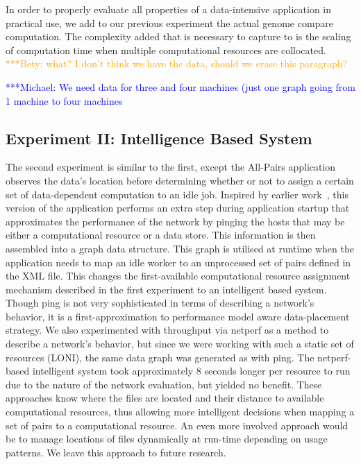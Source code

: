 \documentclass{rspublic}
\newcommand{\micnote}[1]{ {\textcolor{blue} { ***Michael: #1 }}}
\newcommand{\betynote}[1]{ {\textcolor{orange} { ***Bety: #1 }}}
\newcommand{\jhanote}[1]{} \newcommand{\micnote}[1]{}\newcommand{\betynote}[1]{} \newcommand{\fixme}[1]{}
\begin{document}

In order to properly evaluate all properties of a data-intensive
application in practical use, we add to our previous experiment the actual genome
compare computation. The complexity added that is necessary to capture to is
the scaling of computation time when multiple computational resources are
collocated. \betynote{what? I don't think we have the data, should we erase this paragraph?}

\jhanote{We need data for compute (comparison) and I/O (only) for
different data-set sizes} \micnote{We need data for three and four
machines (just one graph going from 1 machine to four machines}

\subsection{Experiment II: Intelligence Based System}
The second experiment is similar to the first, except the All-Pairs
application observes the data's location before determining whether or
not to assign a certain set of data-dependent computation to an idle
job. Inspired by earlier work~\citep{netperf}, this version of the
application performs an extra step during application startup that
approximates the performance of the network by pinging the hosts that
may be either a computational resource or a data store. This
information is then assembled into a graph data structure. This graph
is utilised at runtime when the application needs to map an idle worker
to an unprocessed set of pairs defined in the XML file. This changes the
first-available computational resource assignment mechanism described in
the first experiment to an intelligent based system. Though ping is not
very sophisticated in terms of describing a network's behavior, it is a
first-approximation to performance model aware data-placement strategy.
We also experimented with throughput via netperf \citep{netperf_web} as
a method to describe a network's behavior, but since we were working
with such a static set of resources (LONI), the same data graph was
generated as with ping. The netperf-based intelligent system took
approximately 8 seconds longer per resource to run due to the nature of
the network evaluation, but yielded no benefit. These approaches know
where the files are located and their distance to available
computational resources, thus allowing more intelligent decisions when
mapping a set of pairs to a computational resource. An even more
involved approach would be to manage locations of files dynamically at
run-time depending on usage patterns. We leave this approach to future
research.
\end{document}

